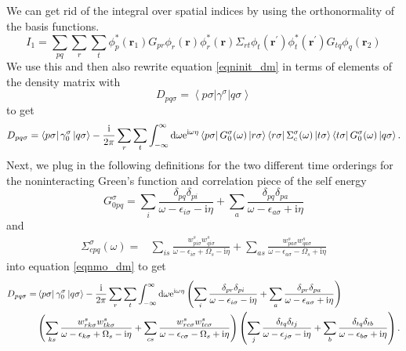 \documentclass[12pt]{caltech_thesis}
\begin{document}
We can get rid of the integral over spatial indices by using the orthonormality of the basis functions.
\begin{equation}
I_1 = \sum_{pq} \sum_{r} \sum_{t} \phi_p^*(\mathbf{r}_1) G_{p r} \phi_r(\mathbf{r}) \phi_r^*(\mathbf{r}) \Sigma_{r t} \phi_t(\mathbf{r}^\prime) \phi_t^*(\mathbf{r}^\prime) G_{t q} \phi_q(\mathbf{r}_2)
\end{equation}
We use this and then also rewrite equation \ref{eqninit_dm} in terms of elements of the density matrix with
\begin{equation}
D_{p q \sigma}=\left\langle p \sigma\left|\gamma^\sigma\right| q \sigma\right\rangle
\end{equation}
to get
\begin{equation}
    D_{p q \sigma}=\bra{p\sigma } \gamma _0^\sigma \ket{q\sigma } -\frac{\mathrm{i }}{2 \pi} \sum_{r} \sum_{t} \int_{-\infty }^{\infty } \mathrm{d} \omega \mathrm{e}^{\mathrm{i \omega \eta}} \bra{p\sigma } G_0^\sigma (\omega) \ket{r\sigma } \bra{r\sigma } \Sigma_c^\sigma (\omega) \ket{t\sigma } \bra{t\sigma } G_0^\sigma (\omega) \ket{q\sigma }.
\label{eqnmo_dm}
\end{equation}
Next, we plug in the following definitions for the two different time orderings for the noninteracting Green's function and correlation piece of the self energy
\begin{equation}
G_{0 pq}^\sigma=\sum_i \frac{\delta_{pq} \delta_{pi}}{\omega-\epsilon_{i\sigma}-\mathrm{i}\eta}+\sum_a \frac{\delta_{pq} \delta_{pa}}{\omega-\epsilon_{a\sigma}+\mathrm{i}\eta}
\end{equation}
and
\begin{equation}
\begin{aligned}
\Sigma_{c p q}^\sigma(\omega)= & \sum_{i s} \frac{w_{p i \sigma}^s w_{q i \sigma}^s}{\omega-\epsilon_{i \sigma}+\Omega_s-\mathrm{i} \eta} +\sum_{a s} \frac{w_{p a \sigma}^s w_{q a \sigma}^s}{\omega-\epsilon_{a \sigma}-\Omega_s+\mathrm{i} \eta}
\end{aligned}
\end{equation}
into equation \ref{eqnmo_dm} to get
\begin{equation}
\begin{aligned}
D_{p q \sigma}= & \bra{p\sigma } \gamma _0^\sigma \ket{q\sigma } -\frac{\mathrm{i }}{2 \pi} \sum_{r} \sum_{t} \int_{-\infty }^{\infty } \mathrm{d} \omega \mathrm{e}^{\mathrm{i \omega \eta}} \left( \sum_i \frac{\delta_{p r} \delta_{p i}}{\omega-\epsilon_{i \sigma}-\mathrm{i} \eta}+\sum_a \frac{\delta_{p r} \delta_{p a}}{\omega-\epsilon_{a \sigma}+\mathrm{i} \eta} \right)\\
& \left( \sum_{k s} \frac{w_{r k \sigma}^s w_{t k \sigma}^s}{\omega-\epsilon_{k \sigma}+\Omega_s-\mathrm{i} \eta} +\sum_{c s} \frac{w_{r c \sigma}^s w_{t c \sigma}^s}{\omega-\epsilon_{c \sigma}-\Omega_s+\mathrm{i} \eta} \right) \left( \sum_j \frac{\delta_{t q} \delta_{t j}}{\omega-\epsilon_{j \sigma}-\mathrm{i} \eta}+\sum_b \frac{\delta_{t q} \delta_{t b}}{\omega-\epsilon_{b \sigma}+\mathrm{i} \eta} \right).
\end{aligned}
\end{equation}
\end{document}
